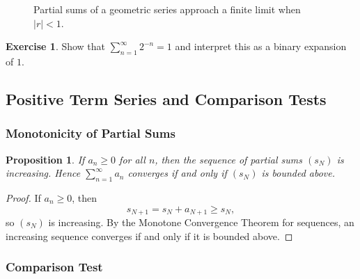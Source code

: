 \documentclass[12pt]{article}
\numberwithin{equation}{section}
\def\abs#1{|#1|}
\DeclarePairedDelimiter{\abs}{\lvert}{\rvert}
\theoremstyle{plain}
\newtheorem{proposition}[theorem]{Proposition}
\theoremstyle{definition}
\newtheorem{exercise}[theorem]{Exercise}
\theoremstyle{remark}
\begin{document}
\begin{figure}[H]
\centering
{}
\caption{Partial sums of a geometric series approach a finite limit when $\abs{r}<1$.}
\end{figure}

\begin{exercise}
Show that $\sum_{n=1}^{\infty} 2^{-n}=1$ and interpret this as a binary expansion of $1$.
\end{exercise}

\newpage

\subsection{Positive Term Series and Comparison Tests}

\subsubsection{Monotonicity of Partial Sums}

\begin{proposition}\label{prop:positive-partialsums}
If $a_n\ge 0$ for all $n$, then the sequence of partial sums $(s_N)$ is increasing.
Hence $\sum_{n=1}^{\infty} a_n$ converges if and only if $(s_N)$ is bounded above.
\end{proposition}

\begin{proof}
If $a_n\ge 0$, then
\[
s_{N+1}=s_N+a_{N+1}\ge s_N,
\]
so $(s_N)$ is increasing.
By the Monotone Convergence Theorem for sequences, an increasing sequence converges if and only if it is bounded above.
\end{proof}

\subsubsection{Comparison Test}
\end{document}
